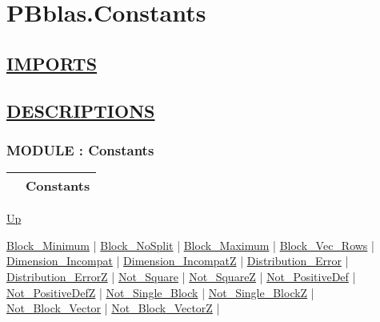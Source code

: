 \chapter*{PBblas.Constants}
\hypertarget{ecldoc:toc:PBblas.Constants}{}

\section*{\underline{IMPORTS}}

\section*{\underline{DESCRIPTIONS}}
\subsection*{MODULE : Constants}
\hypertarget{ecldoc:PBblas.Constants}{}

{\renewcommand{\arraystretch}{1.5}
\begin{tabularx}{\textwidth}{|>{\raggedright\arraybackslash}l|X|}
\hline
\hspace{0pt} & Constants \\
\hline
\end{tabularx}
}

\hyperlink{ecldoc:toc:PBblas}{Up}

\par


\hyperlink{ecldoc:pbblas.constants.block_minimum}{Block\_Minimum}  |
\hyperlink{ecldoc:pbblas.constants.block_nosplit}{Block\_NoSplit}  |
\hyperlink{ecldoc:pbblas.constants.block_maximum}{Block\_Maximum}  |
\hyperlink{ecldoc:pbblas.constants.block_vec_rows}{Block\_Vec\_Rows}  |
\hyperlink{ecldoc:pbblas.constants.dimension_incompat}{Dimension\_Incompat}  |
\hyperlink{ecldoc:pbblas.constants.dimension_incompatz}{Dimension\_IncompatZ}  |
\hyperlink{ecldoc:pbblas.constants.distribution_error}{Distribution\_Error}  |
\hyperlink{ecldoc:pbblas.constants.distribution_errorz}{Distribution\_ErrorZ}  |
\hyperlink{ecldoc:pbblas.constants.not_square}{Not\_Square}  |
\hyperlink{ecldoc:pbblas.constants.not_squarez}{Not\_SquareZ}  |
\hyperlink{ecldoc:pbblas.constants.not_positivedef}{Not\_PositiveDef}  |
\hyperlink{ecldoc:pbblas.constants.not_positivedefz}{Not\_PositiveDefZ}  |
\hyperlink{ecldoc:pbblas.constants.not_single_block}{Not\_Single\_Block}  |
\hyperlink{ecldoc:pbblas.constants.not_single_blockz}{Not\_Single\_BlockZ}  |
\hyperlink{ecldoc:pbblas.constants.not_block_vector}{Not\_Block\_Vector}  |
\hyperlink{ecldoc:pbblas.constants.not_block_vectorz}{Not\_Block\_VectorZ}  |

